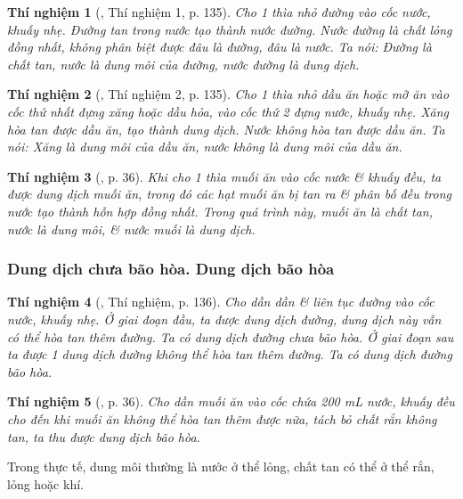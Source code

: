 \documentclass{article}
\newtheorem{thinghiem}{Thí nghiệm}
\begin{document}
\begin{thinghiem}[\cite{SGK_Hoa_Hoc_8}, Thí nghiệm 1, p. 135]
	Cho 1 thìa nhỏ đường vào cốc nước, khuấy nhẹ. Đường tan trong nước tạo thành nước đường. Nước đường là chất lỏng đồng nhất, không phân biệt được đâu là đường, đâu là nước. Ta nói: Đường là \emph{chất tan}, nước là \emph{dung môi} của đường, nước đường là \emph{dung dịch}.
\end{thinghiem}

\begin{thinghiem}[\cite{SGK_Hoa_Hoc_8}, Thí nghiệm 2, p. 135]
	Cho 1 thìa nhỏ dầu ăn hoặc mỡ ăn vào cốc thứ nhất đựng xăng hoặc dầu hỏa, vào cốc thứ 2 đựng nước, khuấy nhẹ. Xăng hòa tan được dầu ăn, tạo thành dung dịch. Nước không hòa tan được dầu ăn. Ta nói: Xăng là \emph{dung môi} của dầu ăn, nước không là dung môi của dầu ăn.
\end{thinghiem}

\begin{thinghiem}[\cite{SGK_KHTN_8_Canh_Dieu}, p. 36]
	Khi cho 1 thìa muối ăn vào cốc nước \& khuấy đều, ta được dung dịch muối ăn, trong đó các hạt muối ăn bị tan ra \& phân bố đều trong nước tạo thành hỗn hợp đồng nhất. Trong quá trình này, muối ăn là \emph{chất tan}, nước là \emph{dung môi}, \& nước muối là \emph{dung dịch}.
\end{thinghiem}

\subsubsection{Dung dịch chưa bão hòa. Dung dịch bão hòa}

\begin{thinghiem}[\cite{SGK_Hoa_Hoc_8}, Thí nghiệm, p. 136]
	Cho dần dần \& liên tục đường vào cốc nước, khuấy nhẹ. Ở giai đoạn đầu, ta được dung dịch đường, dung dịch này vẫn có thể hòa tan thêm đường. Ta có \emph{dung dịch đường chưa bão hòa}. Ở giai đoạn sau ta được 1 dung dịch đường không thể hòa tan thêm đường. Ta có \emph{dung dịch đường bão hòa}.
\end{thinghiem}

\begin{thinghiem}[\cite{SGK_KHTN_8_Canh_Dieu}, p. 36]
	Cho dần muối ăn vào cốc chứa \emph{200 mL} nước, khuấy đều cho đến khi muối ăn không thể hòa tan thêm được nữa, tách bỏ chất rắn không tan, ta thu được \emph{dung dịch bão hòa}.
\end{thinghiem}
Trong thực tế, dung môi thường là nước ở thể lỏng, chất tan có thể ở thể rắn, lỏng hoặc khí.
\end{document}
